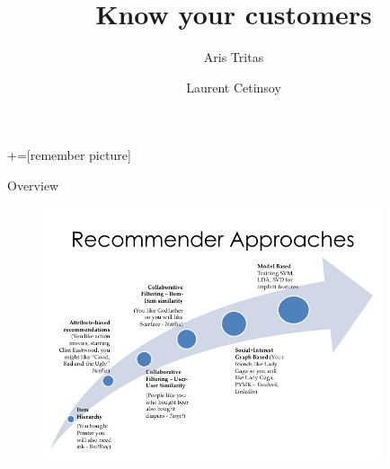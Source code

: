 \documentclass{beamer} %
\author{Aris Tritas \and Laurent Cetinsoy}
\title{Know your customers}
\begin{document}
\maketitle

+=[remember picture]

\everymath{\displaystyle}

\begin{frame}{Overview}

  \begin{figure}

    \includegraphics[width=10cm]{images/collaborative-filtering-and-recommender-systems-by-navisro-analytics-3-728}

  \end{figure}

\end{frame}
\end{document}
